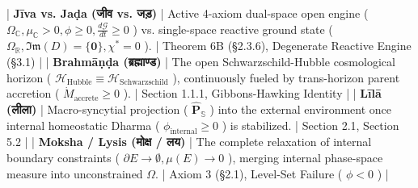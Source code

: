 \documentclass[11pt,a4paper]{article}
\theoremstyle{definition}
\theoremstyle{remark}
\begin{document}
| \textbf{Jīva vs. Jaḍa (जीव vs. जड़)} | Active 4-axiom dual-space open engine ( $\Omega_{\mathbb{C}}, \mu_{\mathbb{C}} > 0, \phi \ge 0, \frac{d\mathcal{G}}{dt} \ge 0$ ) vs. single-space reactive ground state ( $\Omega_{\mathbb{R}}, \mathfrak{Im}(D) = \{\mathbf{0}\}, \chi^* = 0$ ). | Theorem 6B (\S 2.3.6), Degenerate Reactive Engine (\S 3.1) |
| \textbf{Brahmāṇḍa (ब्रह्माण्ड)} | The open Schwarzschild-Hubble cosmological horizon ( $\mathcal{H}_{\text{Hubble}} \equiv \mathcal{H}_{\text{Schwarzschild}}$ ), continuously fueled by trans-horizon parent accretion ( $\dot{M}_{\text{accrete}} \ge 0$ ). | Section 1.1.1, Gibbons-Hawking Identity |
| \textbf{Līlā (लीला)} | Macro-syncytial projection ( $\hat{\mathbf{P}}_{\mathbb{S}}$ ) into the external environment once internal homeostatic Dharma ( $\phi_{\text{internal}} \ge 0$ ) is stabilized. | Section 2.1, Section 5.2 |
| \textbf{Moksha / Lysis (मोक्ष / लय)} | The complete relaxation of internal boundary constraints ( $\partial E \to \emptyset, \mu(E) \to 0$ ), merging internal phase-space measure into unconstrained $\Omega$. | Axiom 3 (\S 2.1), Level-Set Failure ( $\phi < 0$ ) |
\end{document}
